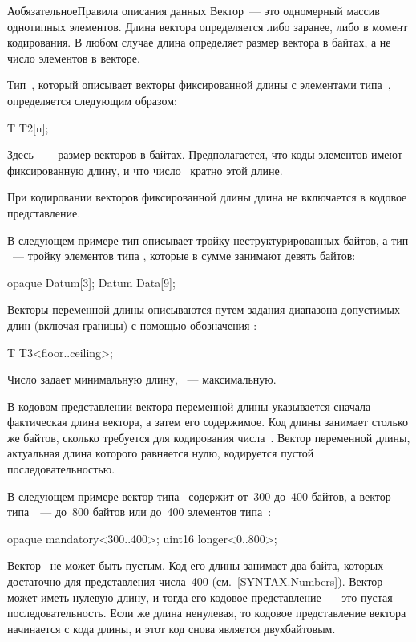 \begin{appendix}{А}{обязательное}{Правила описания данных}
Вектор~--- это одномерный массив однотипных элементов. Длина вектора 
определяется либо заранее, либо в момент кодирования. В любом случае длина 
определяет размер вектора в байтах, а не число элементов в векторе. 

Тип~, который описывает векторы фиксированной длины с элементами 
типа~, определяется следующим образом:
%
\begin{codeblock}
T T2[n];
\end{codeblock}
%
Здесь ~--- размер векторов  в байтах. Предполагается, что коды 
элементов  имеют фиксированную длину, и что число~ кратно этой длине. 

При кодировании векторов фиксированной длины длина не включается в кодовое представление. 

В следующем примере тип  описывает тройку неструктурированных
байтов, а тип ~--- тройку элементов типа , которые в 
сумме занимают девять байтов:
%
\begin{codeblock}
opaque Datum[3];
Datum Data[9];
\end{codeblock}

Векторы переменной длины описываются путем задания диапазона допустимых 
длин (включая границы) с помощью обозначения : 
%
\begin{codeblock}
T T3<floor..ceiling>;
\end{codeblock}
%
Число  задает минимальную длину, ~--- максимальную.  

В кодовом представлении вектора переменной длины указывается сначала 
фактическая длина вектора, а затем его содержимое. Код длины занимает
столько же байтов, сколько требуется для кодирования числа~. 
%
Вектор переменной длины, актуальная длина которого равняется нулю, 
кодируется пустой последовательностью. 

В следующем примере вектор типа~ содержит от~300 
до~400 байтов, а вектор типа~~--- до~800 байтов или до~400 
элементов типа~:
%
\begin{codeblock}
opaque mandatory<300..400>;
uint16 longer<0..800>;
\end{codeblock}
%
Вектор~ не может быть пустым. Код его длины занимает два байта, 
которых достаточно для представления числа~400 (см.~\ref{SYNTAX.Numbers}).
%
Вектор~ может иметь нулевую длину, и тогда его кодовое
представление~--- это пустая последовательность.
%
Если же длина ненулевая, то кодовое представление вектора начинается с кода
длины, и этот код снова является двухбайтовым.


\end{appendix}
